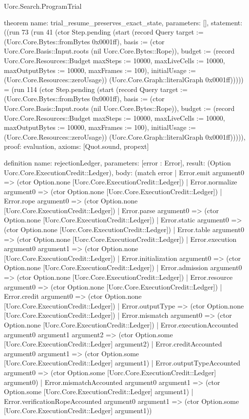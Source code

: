 \begin{lexlean}{Uorc.Search.ProgramTrial}
\begin{semanticmodule}
theorem{
  name: trial_resume_preserves_exact_state,
  parameters: [],
  statement: ((run 73 (run 41 (ctor Step.pending (start (record Query {target := (Uorc.Core.Bytes::fromBytes 0x0001ff), basis := (ctor Uorc.Core.Basis::Input.roots (nil Uorc.Core.Bytes::Rope)), budget := (record Uorc.Core.Resources::Budget {maxSteps := 10000, maxLiveCells := 10000, maxOutputBytes := 10000, maxFrames := 100}), initialUsage := (Uorc.Core.Resources::zeroUsage)}) (Uorc.Core.Graph::literalGraph 0x0001ff))))) = (run 114 (ctor Step.pending (start (record Query {target := (Uorc.Core.Bytes::fromBytes 0x0001ff), basis := (ctor Uorc.Core.Basis::Input.roots (nil Uorc.Core.Bytes::Rope)), budget := (record Uorc.Core.Resources::Budget {maxSteps := 10000, maxLiveCells := 10000, maxOutputBytes := 10000, maxFrames := 100}), initialUsage := (Uorc.Core.Resources::zeroUsage)}) (Uorc.Core.Graph::literalGraph 0x0001ff))))),
  proof: evaluation{},
  axioms: [Quot.sound, propext]
}

definition{
  name: rejectionLedger,
  parameters: [error : Error],
  result: (Option Uorc.Core.ExecutionCredit::Ledger),
  body: (match error
    | Error.emit argument0 => (ctor Option.none [Uorc.Core.ExecutionCredit::Ledger])
    | Error.normalize argument0 => (ctor Option.none [Uorc.Core.ExecutionCredit::Ledger])
    | Error.rope argument0 => (ctor Option.none [Uorc.Core.ExecutionCredit::Ledger])
    | Error.parse argument0 => (ctor Option.none [Uorc.Core.ExecutionCredit::Ledger])
    | Error.static argument0 => (ctor Option.none [Uorc.Core.ExecutionCredit::Ledger])
    | Error.table argument0 => (ctor Option.none [Uorc.Core.ExecutionCredit::Ledger])
    | Error.execution argument0 argument1 => (ctor Option.none [Uorc.Core.ExecutionCredit::Ledger])
    | Error.initialization argument0 => (ctor Option.none [Uorc.Core.ExecutionCredit::Ledger])
    | Error.admission argument0 => (ctor Option.none [Uorc.Core.ExecutionCredit::Ledger])
    | Error.resource argument0 => (ctor Option.none [Uorc.Core.ExecutionCredit::Ledger])
    | Error.credit argument0 => (ctor Option.none [Uorc.Core.ExecutionCredit::Ledger])
    | Error.outputType => (ctor Option.none [Uorc.Core.ExecutionCredit::Ledger])
    | Error.mismatch argument0 => (ctor Option.none [Uorc.Core.ExecutionCredit::Ledger])
    | Error.executionAccounted argument0 argument1 argument2 => (ctor Option.some [Uorc.Core.ExecutionCredit::Ledger] argument2)
    | Error.creditAccounted argument0 argument1 => (ctor Option.some [Uorc.Core.ExecutionCredit::Ledger] argument1)
    | Error.outputTypeAccounted argument0 => (ctor Option.some [Uorc.Core.ExecutionCredit::Ledger] argument0)
    | Error.mismatchAccounted argument0 argument1 => (ctor Option.some [Uorc.Core.ExecutionCredit::Ledger] argument1)
    | Error.verificationRopeAccounted argument0 argument1 => (ctor Option.some [Uorc.Core.ExecutionCredit::Ledger] argument1))
}
\end{semanticmodule}
\end{lexlean}
